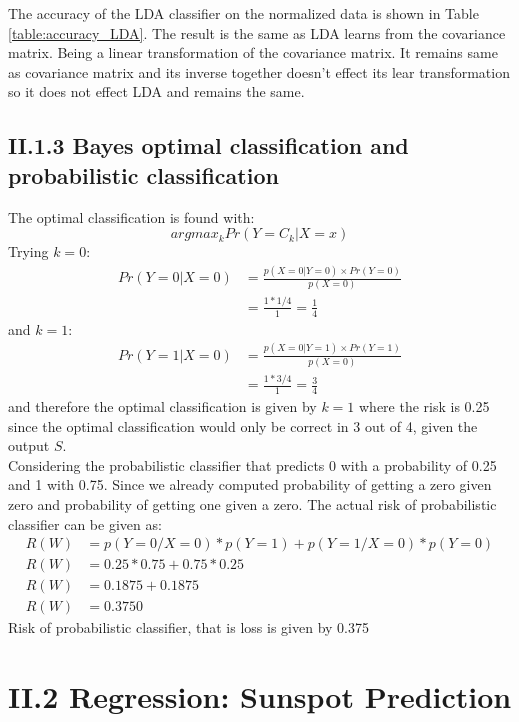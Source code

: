 \documentclass[12pt]{article}
\begin{document}
    The accuracy of the LDA classifier on the normalized data is shown in Table \ref{table:accuracy_LDA}. The result is the same as LDA learns from the covariance matrix. Being a linear transformation of the covariance matrix. It remains same as covariance matrix and its inverse together doesn't effect its lear transformation so it does not effect LDA and remains the same. 

  \subsection*{II.1.3 Bayes optimal classification and probabilistic classification}

    The optimal classification is found with:
      $$ argmax_k Pr(Y = C_k | X = x) $$ 
    Trying $k = 0$:
      \begin{align*}
        Pr(Y=0|X=0) &= \frac{p(X=0|Y=0) \times Pr(Y=0)}{p(X=0)} \\
                    &= \frac{1 * 1/4}{1} = \frac{1}{4}
      \end{align*}
    and $k = 1$:
      \begin{align*}
        Pr(Y=1|X=0) &= \frac{p(X=0|Y=1) \times Pr(Y=1)}{p(X=0)} \\
                    &= \frac{1 * 3/4}{1} = \frac{3}{4}
      \end{align*}
    and therefore the optimal classification is given by $k=1$ where the risk is 0.25 since the optimal classification would only be correct in 3 out of 4, given the output $S$.\\
    
    Considering the probabilistic classifier that predicts 0 with a probability of 0.25 and 1 with 0.75. Since we already computed probability of getting a zero given zero and probability of getting one given a zero. The actual risk of probabilistic classifier can be given as:\\
    \begin{align*}
      R(W) &= p(Y=0/X=0) * p(Y = 1) + p(Y = 1/ X= 0) * p(Y = 0) \\ 
      R(W) &= 0.25 * 0.75 + 0.75 * 0.25\\
      R(W) &= 0.1875 + 0.1875\\
      R(W) &= 0.3750
    \end{align*}
Risk of probabilistic classifier, that is loss is given by 0.375




\section*{II.2 Regression: Sunspot Prediction}
\end{document}
